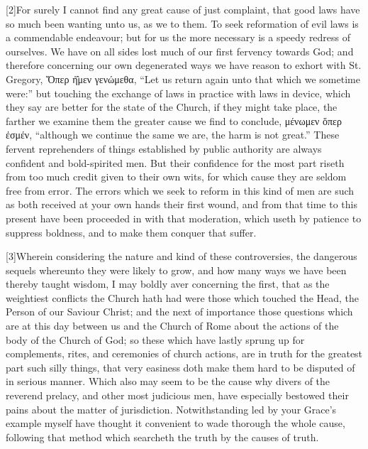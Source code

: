 [2]For surely I cannot find any great cause of just complaint, that good laws have so much been wanting unto us, as we to them. To seek reformation of evil laws is a commendable endeavour; but for us the more necessary is a speedy redress of ourselves. We have on all sides lost much of our first fervency towards God; and therefore concerning our own degenerated ways we have reason to exhort with St. Gregory, Ὅπερ ἠ̑μεν γενώμεθα, “Let us return again unto that which we sometime were:” but touching the exchange of laws in practice with laws in device, which they say are better for the state of the Church, if they might take place, the farther we examine them the greater cause we find to conclude, μένωμεν ὅπερ ἐσμέν, “although we continue the same we are, the harm is not great.” These fervent reprehenders of things established by public authority are always confident and bold-spirited men. But their confidence for the most part riseth from too much credit given to their own wits, for which cause they are seldom free from error. The errors which we seek to reform in this kind of men are such as both received at your own hands their first wound, and from that time to this present have been proceeded in with that moderation, which useth by patience to suppress boldness, and to make them conquer that suffer.

[3]Wherein considering the nature and kind of these controversies, the dangerous sequels whereunto they were likely to grow, and how many ways we have been thereby taught wisdom, I may boldly aver concerning the first, that as the weightiest conflicts the Church hath had were those which touched the Head, the Person of our Saviour Christ; and the next of importance those questions which are at this day between us and the Church of Rome about the actions of the body of the Church of God; so these which have lastly sprung up for complements, rites, and ceremonies of church actions, are in truth for the greatest part such silly things, that very easiness doth make them hard to be disputed of in serious manner. Which also may seem to be the cause why divers of the reverend prelacy, and other most judicious men, have especially bestowed their pains about the matter of jurisdiction. Notwithstanding led by your Grace’s example myself have thought it convenient to wade thorough the whole cause, following that method which searcheth the truth by the causes of truth.

